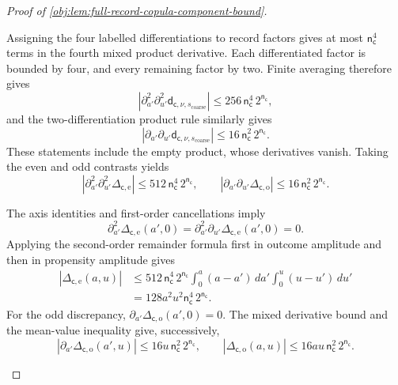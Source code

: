 \begin{proof}[Proof of \cref{obj:lem:full-record-copula-component-bound}]
\begin{enumerate}
Assigning the four labelled differentiations to record factors gives at most
\(\mathsf n_{\mathsf c}^4\) terms in the fourth mixed product derivative. Each differentiated factor is bounded by four, and every remaining factor by two. Finite averaging therefore gives
\[
\left|
\partial_{a'}^2\partial_{u'}^2
 \mathsf d_{\mathsf c,\nu,s_{\mathrm{coarse}}}
\right|
 \le256\,\mathsf n_{\mathsf c}^4\,2^{\mathsf n_{\mathsf c}},
\]
and the two-differentiation product rule similarly gives
\[
\left|
\partial_{a'}\partial_{u'}
 \mathsf d_{\mathsf c,\nu,s_{\mathrm{coarse}}}
\right|
 \le16\,\mathsf n_{\mathsf c}^2\,2^{\mathsf n_{\mathsf c}}.
\]
These statements include the empty product, whose derivatives vanish. Taking the even and odd contrasts yields
\[
\left|
\partial_{a'}^2\partial_{u'}^2
 \Delta_{\mathsf c,\mathrm e}
\right|
 \le512\,\mathsf n_{\mathsf c}^4\,2^{\mathsf n_{\mathsf c}},
\qquad
\left|
\partial_{a'}\partial_{u'}
 \Delta_{\mathsf c,\mathrm o}
\right|
 \le16\,\mathsf n_{\mathsf c}^2\,2^{\mathsf n_{\mathsf c}}.
\]

The axis identities and first-order cancellations imply
\[
\partial_{a'}^2\Delta_{\mathsf c,\mathrm e}(a',0)
 =
\partial_{a'}^2\partial_{u'}
 \Delta_{\mathsf c,\mathrm e}(a',0)=0.
\]
Applying the second-order remainder formula first in outcome amplitude and then in propensity amplitude gives
\[
\begin{aligned}
|\Delta_{\mathsf c,\mathrm e}(a,u)|
&\le
512\,\mathsf n_{\mathsf c}^4\,2^{\mathsf n_{\mathsf c}}
 \int_0^a(a-a')\,da'
 \int_0^u(u-u')\,du'\\
&=
128a^2u^2\mathsf n_{\mathsf c}^4\,2^{\mathsf n_{\mathsf c}}.
\end{aligned}
\]
For the odd discrepancy,
\(\partial_{a'}\Delta_{\mathsf c,\mathrm o}(a',0)=0\).
The mixed derivative bound and the mean-value inequality give, successively,
\[
|\partial_{a'}\Delta_{\mathsf c,\mathrm o}(a',u)|
 \le16u\,\mathsf n_{\mathsf c}^2\,2^{\mathsf n_{\mathsf c}},
\qquad
|\Delta_{\mathsf c,\mathrm o}(a,u)|
 \le16au\,\mathsf n_{\mathsf c}^2\,2^{\mathsf n_{\mathsf c}}.
\]


\end{enumerate}
\end{proof}

